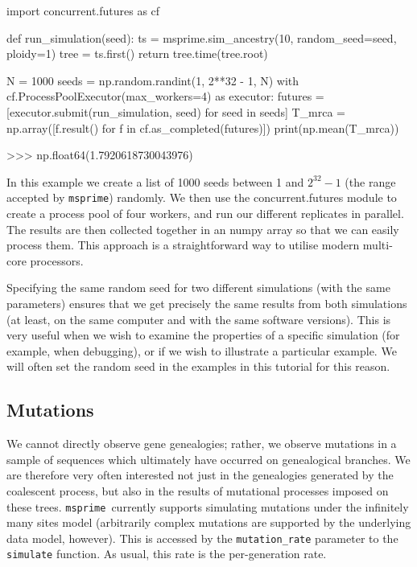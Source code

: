 \documentclass[graybox]{svmult}
\newcommand{\msprime}[0]{\texttt{msprime}}
\begin{document}
\begin{pythoncode}
import concurrent.futures as cf

def run_simulation(seed):
    ts = msprime.sim_ancestry(10, random_seed=seed, ploidy=1)
    tree = ts.first()
    return tree.time(tree.root)

N = 1000
seeds = np.random.randint(1, 2**32 - 1, N)
with cf.ProcessPoolExecutor(max_workers=4) as executor:
     futures = [executor.submit(run_simulation, seed) for seed in seeds]
     T_mrca = np.array([f.result() for f in cf.as_completed(futures)])
print(np.mean(T_mrca))

>>> np.float64(1.7920618730043976)
\end{pythoncode}

    In this example we create a list of 1000 seeds between 1 and $2^{32} -
1$ (the range accepted by \msprime) randomly. We then use the
concurrent.futures module to create a process pool of four workers, and
run our different replicates in parallel. The results are then
collected together in an numpy array so that we can easily process them.
This approach is a straightforward way to utilise modern
multi-core processors.

Specifying the same random seed for two different simulations (with the
same parameters) ensures that we get precisely the same results from
both simulations (at least, on the same computer and with the same
software versions). This is very useful when we wish to examine the
properties of a specific simulation (for example, when debugging), or if
we wish to illustrate a particular example. We will often set the random
seed in the examples in this tutorial for this reason.

    \subsection{Mutations}\label{mutations}

We cannot directly observe gene genealogies; rather, we observe mutations in a sample of sequences which ultimately have occurred on genealogical branches. We are
therefore very often interested not just in the genealogies generated by the coalescent process, but also in the results of
mutational processes imposed on these trees. \msprime\ currently supports
simulating mutations under the infinitely many sites model (arbitrarily complex
mutations are supported by the underlying data model, however). This is
accessed by the \texttt{mutation\_rate} parameter to the
\texttt{simulate} function. As usual, this rate is the per-generation
rate.
\end{document}
